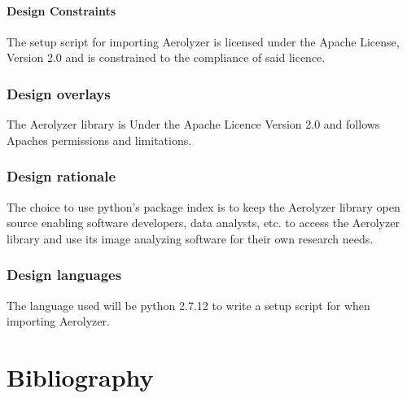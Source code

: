 \documentclass[onecolumn, draftclsnofoot,10pt, compsoc]{IEEEtran}
\begin{document}
\begin{singlespace}
          \paragraph{Design Constraints}
          The setup script for importing Aerolyzer is licensed under the Apache License, Version 2.0 and is constrained to the compliance of said licence. 
      \subsubsection{Design overlays}
      		The Aerolyzer library is Under the Apache Licence Version 2.0 and follows Apaches permissions and limitations.
      \subsubsection{Design rationale}
      		The choice to use python’s package index is to keep the Aerolyzer library open source enabling software developers, data analysts, etc. to access the Aerolyzer library and use its image analyzing software for their own research needs. 
      \subsubsection{Design languages}
      The language used will be python 2.7.12 to write a setup script for when importing Aerolyzer.




\section{Bibliography}
	
	

\end{singlespace}
\end{document}
